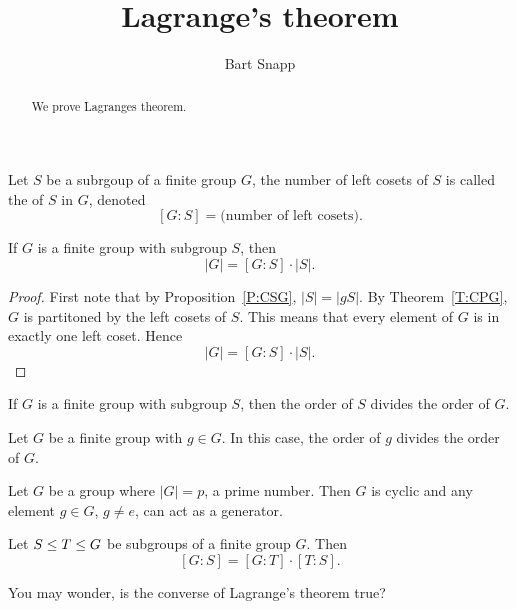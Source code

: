 \documentclass{ximera}
\author{Bart Snapp}
\title{Lagrange's theorem}
\begin{document}
\begin{abstract}
  We prove Lagranges theorem.
\end{abstract}
\maketitle

\begin{definition}
  Let $S$ be a subrgoup of a finite group $G$, the number of left
  cosets of $S$ is called the  of $S$ in $G$, denoted
  \[
  [G:S] = \text{(number of left cosets)}.
  \]
\end{definition}



\begin{theorem}
  If $G$ is a finite group with subgroup $S$, then 
  \[
  |G| = [G:S]\cdot |S|.
  \]
  \begin{proof}
    First note that by Proposition~\ref{P:CSG}, $|S| = |gS|$. By
    Theorem~\ref{T:CPG}, $G$ is partitoned by the left cosets of
    $S$. This means that every element of $G$ is in exactly one left
    coset. Hence
    \[
    |G| = [G:S]\cdot |S|.
    \]
  \end{proof}
\end{theorem}

\begin{corollary}
  If $G$ is a finite group with subgroup $S$, then the order of $S$
  divides the order of $G$.
\end{corollary}

\begin{corollary}
  Let $G$ be a finite group with $g\in G$. In this case, the order of
  $g$ divides the order of $G$.
\end{corollary}

\begin{corollary}
  Let $G$ be a group where $|G|= p$, a prime number. Then $G$ is
  cyclic and any element $g\in G$, $g\ne e$, can act as a generator.
\end{corollary}

\begin{corollary}
  Let $S \leq T \leq G$ be subgroups of a finite group
  $G$. Then
  \[
  [G:S] = [G:T]\cdot [T:S].
  \]
\end{corollary}

You may wonder, is the converse of Lagrange's theorem true?
\end{document}
